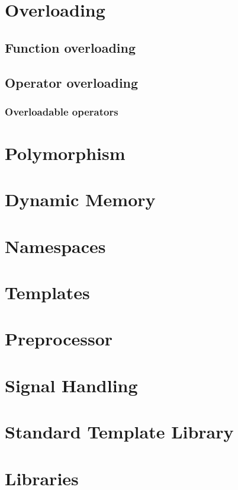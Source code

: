 \documentclass[10pt,a4paper]{scrartcl}
\begin{document}
\begin{multicols*}{2}
\section{Overloading}

\subsection{Function overloading}

\subsection{Operator overloading}

\subsubsection{Overloadable operators}

\section{Polymorphism}

\section{Dynamic Memory}

\section{Namespaces}

\section{Templates}

\section{Preprocessor}

\section{Signal Handling}

\section{Standard Template Library}

\section{Libraries}


\end{multicols*}
\end{document}
